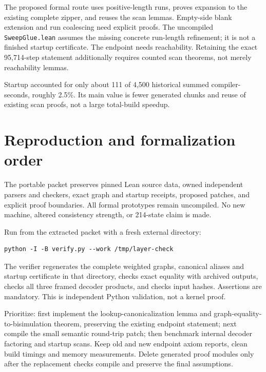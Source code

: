 \documentclass[11pt]{article}
\begin{document}
The proposed formal route uses positive-length runs, proves expansion to the existing complete zipper, and reuses the scan lemmas. Empty-side blank extension and run coalescing need explicit proofs. The uncompiled \texttt{SweepGlue.lean} assumes the missing concrete run-length refinement; it is not a finished startup certificate. The endpoint needs reachability. Retaining the exact 95,714-step statement additionally requires counted scan theorems, not merely reachability lemmas.

Startup accounted for only about 111 of 4,500 historical summed compiler-seconds, roughly 2.5\%. Its main value is fewer generated chunks and reuse of existing scan proofs, not a large total-build speedup.

\section{Reproduction and formalization order}
The portable packet preserves pinned Lean source data, owned independent parsers and checkers, exact graph and startup receipts, proposed patches, and explicit proof boundaries. All formal prototypes remain uncompiled. No new machine, altered consistency strength, or 214-state claim is made.

Run from the extracted packet with a fresh external directory:
\begin{verbatim}
python -I -B verify.py --work /tmp/layer-check
\end{verbatim}
The verifier regenerates the complete weighted graphs, canonical aliases and startup certificate in that directory, checks exact equality with archived outputs, checks all three framed decoder products, and checks input hashes. Assertions are mandatory. This is independent Python validation, not a kernel proof.

Prioritize: first implement the lookup-canonicalization lemma and graph-equality-to-bisimulation theorem, preserving the existing endpoint statement; next compile the small semantic round-trip patch; then benchmark internal decoder factoring and startup scans. Keep old and new endpoint axiom reports, clean build timings and memory measurements. Delete generated proof modules only after the replacement checks compile and preserve the final assumptions.
\end{document}
